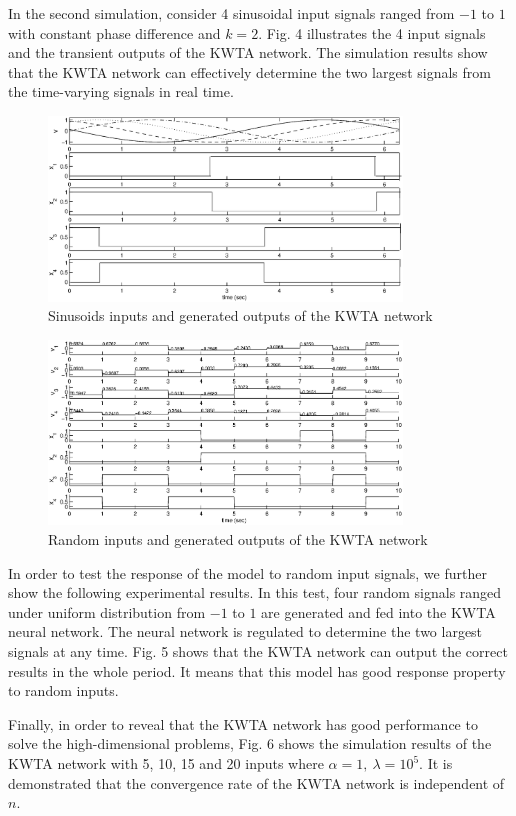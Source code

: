 \documentclass[conference]{IEEEtran}
\begin{document}
In the second simulation, consider 4 sinusoidal input signals
ranged from $-1$ to $1$ with constant phase difference and $k=2$.
Fig. 4 illustrates the 4 input signals and the transient outputs
of the KWTA network. The simulation results show that the KWTA
network can effectively determine the two largest signals from the
time-varying signals in real time.

\begin{figure}[htp]
\centerline{\includegraphics[width=3.7in]{sinu.eps}}
\caption{Sinusoids inputs and generated outputs of the KWTA network}
\label{fig_4}
\end{figure}

\begin{figure}[htp]
\centerline{\includegraphics[width=3.7in]{ramdon10.eps}}
\caption{Random inputs and generated outputs of the KWTA network}
\label{fig_5}
\end{figure}

In order to test the response of the model to random input signals,
we further show the following experimental results. In this test,
four random signals ranged under uniform distribution from $-1$ to
$1$ are generated and fed into the KWTA neural network. The neural
network is regulated to determine the two largest signals at any
time. Fig. 5 shows that the KWTA network can output the correct
results in the whole period. It means that this model has good
response property to random inputs.



Finally, in order to reveal that the KWTA network has good
performance to solve the high-dimensional problems, Fig. 6 shows the
simulation results of the KWTA network with 5, 10, 15 and 20 inputs
where $\alpha=1,\ \lambda=10^{5}$. It is demonstrated that the
convergence rate of the KWTA network is independent of $n$.
\end{document}

